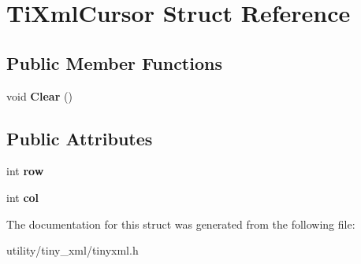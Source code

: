 \hypertarget{struct_ti_xml_cursor}{}\section{Ti\+Xml\+Cursor Struct Reference}
\label{struct_ti_xml_cursor}
\subsection*{Public Member Functions}
\begin{DoxyCompactItemize}
\item 
\hypertarget{struct_ti_xml_cursor_a1e6fa622b59dafb71b6efe595105dcdd}{}\label{struct_ti_xml_cursor_a1e6fa622b59dafb71b6efe595105dcdd} 
void {\bfseries Clear} ()
\end{DoxyCompactItemize}
\subsection*{Public Attributes}
\begin{DoxyCompactItemize}
\item 
\hypertarget{struct_ti_xml_cursor_a5b54dd949820c2db061e2be41f3effb3}{}\label{struct_ti_xml_cursor_a5b54dd949820c2db061e2be41f3effb3} 
int {\bfseries row}
\item 
\hypertarget{struct_ti_xml_cursor_a5694d7ed2c4d20109d350c14c417969d}{}\label{struct_ti_xml_cursor_a5694d7ed2c4d20109d350c14c417969d} 
int {\bfseries col}
\end{DoxyCompactItemize}


The documentation for this struct was generated from the following file\+:\begin{DoxyCompactItemize}
\item 
utility/tiny\+\_\+xml/tinyxml.\+h\end{DoxyCompactItemize}
